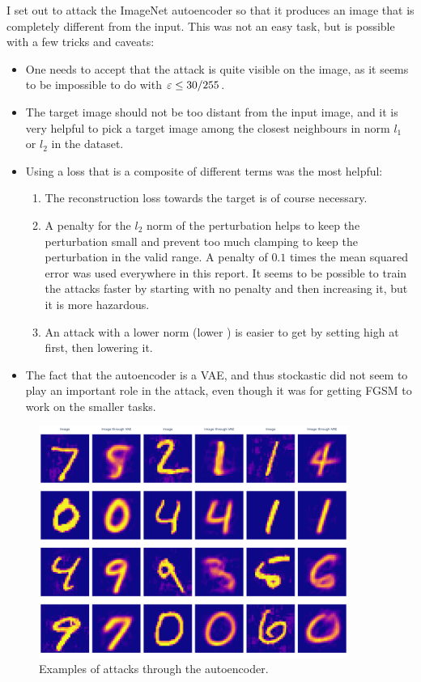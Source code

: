 \documentclass[]{scrarticle}
\begin{document}
I set out to attack the ImageNet autoencoder
so that it produces an image that is completely different from the input.
This was not an easy task, but is possible with a few tricks and caveats:
\begin{itemize}
  \item One needs to accept that the attack is quite visible on the image,
    as it seems to be impossible to do with $\varepsilon \leq 30 / 255$.
  \item The target image should not be too distant from the input image,
    and it is very helpful to pick a target image among the closest neighbours
    in norm $l_1$ or $l_2$ in the dataset.
  \item Using a loss that is a composite of different terms was the most helpful:
    \begin{enumerate}
      \item The reconstruction loss towards the target is of course necessary.
      \item A penalty for the $l_2$ norm of the perturbation helps to keep the
        perturbation small and prevent too much clamping to keep the perturbation
        in the valid range. A penalty of $0.1$ times the mean squared error was used
        everywhere in this report. It seems to be possible to train the attacks faster by
        starting with no penalty and then increasing it, but it is more hazardous.
      \item An attack with a lower norm (lower \e) is easier to get by setting \e high at first,
        then lowering it.
    \end{enumerate}
  \item The fact that the autoencoder is a VAE, and thus stockastic did not seem to
    play an important role in the attack, even though it was for getting FGSM to work on
    the smaller tasks.
\end{itemize}

\begin{figure}[h]
  \centering
  \includegraphics[width=0.9\textwidth]{images/ae_many_targeted_attack_examples.png}
  \caption{
    Examples of attacks through the autoencoder.
  }
  \label{fig:ae_targeted_attack_example2}
\end{figure}
\end{document}
